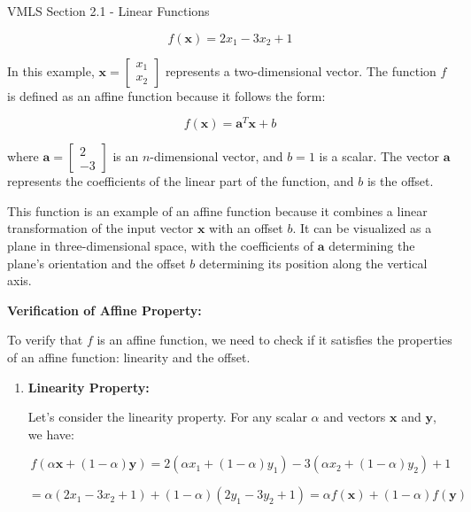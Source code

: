 \begin{notes}{VMLS Section 2.1 - Linear Functions}
\begin{highlight}
        \[
        f(\mathbf{x}) = 2x_1 - 3x_2 + 1
        \]
        
        In this example, \( \mathbf{x} = \begin{bmatrix} x_1 \\ x_2 \end{bmatrix} \) represents a two-dimensional vector. The function \( f \) is defined as an affine function because it follows the form:
        
        \[
        f(\mathbf{x}) = \mathbf{a}^T \mathbf{x} + b
        \]
        
        where \( \mathbf{a} = \begin{bmatrix} 2 \\ -3 \end{bmatrix} \) is an \( n \)-dimensional vector, and \( b = 1 \) is a scalar. The vector \( \mathbf{a} \) represents the coefficients of the linear part of the function, and 
        \( b \) is the offset.
        
        This function is an example of an affine function because it combines a linear transformation of the input vector \( \mathbf{x} \) with an offset \( b \). It can be visualized as a plane in three-dimensional space, with the 
        coefficients of \( \mathbf{a} \) determining the plane's orientation and the offset \( b \) determining its position along the vertical axis.
        
        \vspace*{1em} \textbf{Verification of Affine Property:} \vspace*{1em}
        
        To verify that \( f \) is an affine function, we need to check if it satisfies the properties of an affine function: linearity and the offset.
        
        \begin{enumerate}
            \item \textbf{Linearity Property:}
            
            Let's consider the linearity property. For any scalar \(\alpha\) and vectors \(\mathbf{x}\) and \(\mathbf{y}\), we have:
            
            \[
            f(\alpha\mathbf{x} + (1-\alpha)\mathbf{y}) = 2(\alpha x_1 + (1-\alpha)y_1) - 3(\alpha x_2 + (1-\alpha)y_2) + 1
            \]
            
            \[
            = \alpha(2x_1 - 3x_2 + 1) + (1-\alpha)(2y_1 - 3y_2 + 1) = \alpha f(\mathbf{x}) + (1-\alpha) f(\mathbf{y})
            \]
            

\end{enumerate}
\end{highlight}
\end{notes}
